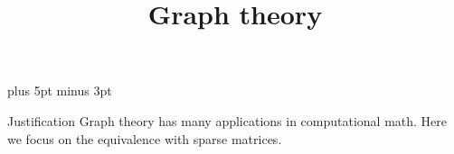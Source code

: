 \documentclass[11pt,headernav]{beamer}
\begin{document}
\parskip=10pt plus 5pt minus 3pt

\title{Graph theory}
\author{\hpcteachers}
\date{\hpcsemester}

\begin{frame}
  \titlepage
\end{frame}

\begin{frame}{Justification}
  Graph theory has many applications in computational math.
  Here we focus on the equivalence with sparse matrices.
\end{frame}


\end{document}
